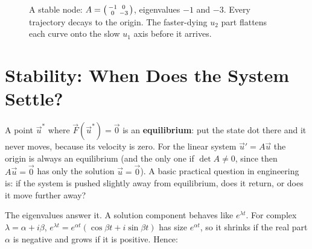 \begin{figure}[H]
\centering
{}
\caption{A stable node: $A=\protect\begin{psmallmatrix} -1 & 0 \\ 0 &
-3\protect\end{psmallmatrix}$, eigenvalues $-1$ and $-3$. Every trajectory decays
to the origin. The faster-dying $u_2$ part flattens each curve onto the slow
$u_1$ axis before it arrives.}
\label{ch39:fig-node}
\end{figure}

\section{Stability: When Does the System Settle?}
\label{ch39:stability}

A point $\vec u^{*}$ where $\vec F(\vec u^{*}) = \vec 0$ is an
\textbf{equilibrium}: put the state dot there and it never moves, because its
velocity is zero. For the linear system $\vec u' = A\vec u$ the origin is always
an equilibrium (and the only one if $\det A\neq 0$, since then $A\vec u=\vec 0$
has only the solution $\vec u=\vec 0$). A basic practical question
in engineering is: if the system is pushed slightly away from equilibrium,
does it return, or does it move further away?

The eigenvalues answer it. A solution component behaves like
$e^{\lambda t}$. For complex $\lambda=\alpha+i\beta$,
$e^{\lambda t}=e^{\alpha t}(\cos\beta t+i\sin\beta t)$ has size $e^{\alpha t}$,
so it shrinks if the real part $\alpha$ is negative and
grows if it is positive. Hence:

